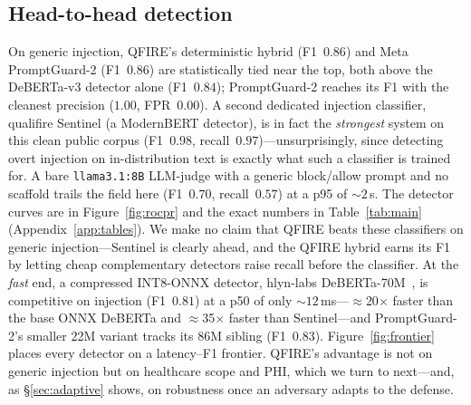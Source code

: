 \documentclass[11pt]{article}
\begin{document}
\subsection{Head-to-head detection}
\begin{sloppypar}
On generic injection, QFIRE's deterministic hybrid (F1~$0.86$) and Meta
PromptGuard-2 (F1~$0.86$) are statistically tied near the top, both above the
DeBERTa-v3 detector alone (F1~$0.84$); PromptGuard-2 reaches its F1 with the
cleanest precision ($1.00$, FPR~$0.00$). A second dedicated injection classifier,
qualifire Sentinel (a ModernBERT detector), is in fact the \emph{strongest} system
on this clean public corpus (F1~$0.98$, recall~$0.97$)---unsurprisingly, since
detecting overt injection on in-distribution text is exactly what such a classifier
is trained for. A bare \texttt{llama3.1:8B} LLM-judge with a generic block/allow
prompt and no scaffold trails the field here (F1~$0.70$, recall~$0.57$) at a p95 of
${\sim}2$\,s. The detector curves are in Figure~\ref{fig:rocpr} and the exact numbers
in Table~\ref{tab:main} (Appendix~\ref{app:tables}). We make no claim that QFIRE
beats these classifiers on generic injection---Sentinel is clearly ahead, and the
QFIRE hybrid earns its F1 by letting cheap complementary detectors raise recall
before the classifier. At the \emph{fast} end, a compressed INT8-ONNX detector,
hlyn-labs DeBERTa-70M~\cite{hlyn_deberta70m}, is competitive on injection
(F1~$0.81$) at a p50 of only ${\sim}12$\,ms---$\approx$20$\times$ faster than the
base ONNX DeBERTa and $\approx$35$\times$ faster than Sentinel---and PromptGuard-2's
smaller 22M variant tracks its 86M sibling (F1~$0.83$). Figure~\ref{fig:frontier}
places every detector on a latency--F1 frontier. QFIRE's advantage is not on generic
injection but on healthcare scope and PHI, which we turn to next---and, as
\S\ref{sec:adaptive} shows, on robustness once an adversary adapts to the defense.
\end{sloppypar}
\end{document}
